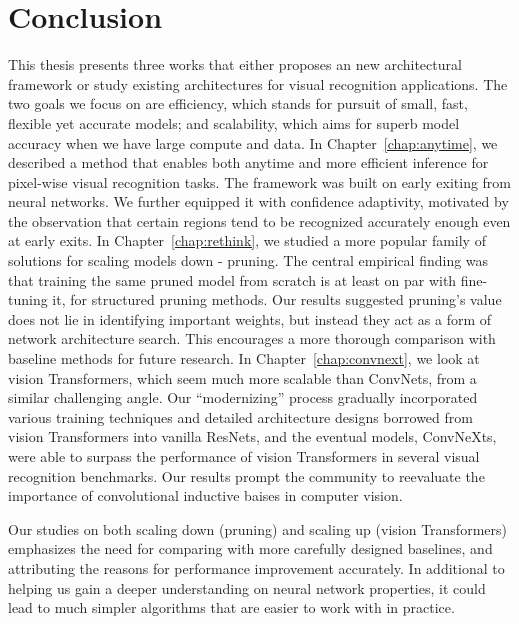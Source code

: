 \documentclass{ucbthesis}
\begin{document}
\chapter{Conclusion}
This thesis presents three works that either proposes an new architectural framework or study existing architectures for visual recognition applications. The two goals we focus on are efficiency, which stands for pursuit of small, fast, flexible yet accurate models; and scalability, which aims for superb model accuracy when we have large compute and data. In Chapter~\ref{chap:anytime}, we described a method that enables both anytime and more efficient inference for pixel-wise visual recognition tasks. The framework was built on early exiting from neural networks. We further equipped it with confidence adaptivity, motivated by the observation that certain regions tend to be recognized accurately enough even at early exits. In Chapter~\ref{chap:rethink}, we studied a more popular family of solutions for scaling models down - pruning. The central empirical finding was that training the same pruned model from scratch is at least on par with fine-tuning it, for structured pruning methods. Our results suggested pruning's value does not lie in identifying important weights, but instead they act as a form of network architecture search. This encourages a more thorough comparison with baseline methods for future research. In Chapter~\ref{chap:convnext}, we look at vision Transformers, which seem much more scalable than ConvNets, from a similar challenging angle. Our ``modernizing'' process gradually incorporated various training techniques and detailed architecture designs borrowed from vision Transformers into vanilla ResNets, and the eventual models, ConvNeXts, were able to surpass the performance of vision Transformers in several visual recognition benchmarks. Our results prompt the community to reevaluate the importance of convolutional inductive baises in computer vision. 

Our studies on both scaling down (pruning) and scaling up (vision Transformers) emphasizes the need for comparing with more carefully designed baselines, and attributing the reasons for performance improvement accurately. In additional to helping us gain a deeper understanding on neural network properties, it could lead to much simpler algorithms that are easier to work with in practice.
\end{document}
